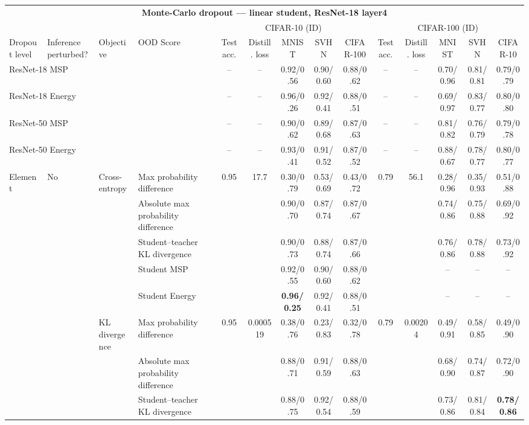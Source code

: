 \documentclass[border=2pt]{standalone}
\begin{document}
\scriptsize
\setlength{\tabcolsep}{4pt}
\begin{tabular}{llllcccccccccc}
\multicolumn{14}{c}{\textbf{Monte-Carlo dropout --- linear student, ResNet-18 layer4}}\\[4pt]
\multicolumn{4}{c}{} & \multicolumn{5}{c}{CIFAR-10 (ID)} & \multicolumn{5}{c}{CIFAR-100 (ID)} \\
\cmidrule(lr){5-9} \cmidrule(lr){10-14}
\toprule
Dropout level & Inference perturbed? & Objective & OOD Score & Test acc. & Distill. loss & MNIST & SVHN & CIFAR-100 & Test acc. & Distill. loss & MNIST & SVHN & CIFAR-10 \\
\midrule
\multicolumn{4}{l}{ResNet-18 MSP} & -- & -- & 0.92/0.56 & 0.90/0.60 & 0.88/0.62 & -- & -- & 0.70/0.96 & 0.81/0.81 & 0.79/0.79 \\
\multicolumn{4}{l}{ResNet-18 Energy} & -- & -- & 0.96/0.26 & 0.92/0.41 & 0.88/0.51 & -- & -- & 0.69/0.97 & 0.83/0.77 & 0.80/0.80 \\
\multicolumn{4}{l}{ResNet-50 MSP} & -- & -- & 0.90/0.62 & 0.89/0.68 & 0.87/0.63 & -- & -- & 0.81/0.82 & 0.76/0.79 & 0.79/0.78 \\
\multicolumn{4}{l}{ResNet-50 Energy} & -- & -- & 0.93/0.41 & 0.91/0.52 & 0.87/0.52 & -- & -- & 0.88/0.67 & 0.78/0.77 & 0.80/0.77 \\
\midrule
Element & No & Cross-entropy & Max probability difference & 0.95 & 17.7 & 0.30/0.79 & 0.53/0.69 & 0.43/0.72 & 0.79 & 56.1 & 0.28/0.96 & 0.35/0.93 & 0.51/0.88 \\
 &  &  & Absolute max probability difference &  &  & 0.90/0.70 & 0.87/0.74 & 0.87/0.67 &  &  & 0.74/0.86 & 0.75/0.88 & 0.69/0.92 \\
 &  &  & Student--teacher KL divergence &  &  & 0.90/0.73 & 0.88/0.74 & 0.87/0.66 &  &  & 0.76/0.86 & 0.78/0.88 & 0.73/0.92 \\
 &  &  & Student MSP &  &  & 0.92/0.55 & 0.90/0.60 & 0.88/0.62 &  &  & -- & -- & -- \\
 &  &  & Student Energy &  &  & \textbf{0.96/0.25} & 0.92/0.41 & 0.88/0.51 &  &  & -- & -- & -- \\
 &  & KL divergence & Max probability difference & 0.95 & 0.000519 & 0.38/0.76 & 0.23/0.83 & 0.32/0.78 & 0.79 & 0.00204 & 0.49/0.91 & 0.58/0.85 & 0.49/0.90 \\
 &  &  & Absolute max probability difference &  &  & 0.88/0.71 & 0.91/0.59 & 0.88/0.63 &  &  & 0.68/0.90 & 0.74/0.87 & 0.72/0.90 \\
 &  &  & Student--teacher KL divergence &  &  & 0.88/0.75 & 0.92/0.54 & 0.88/0.59 &  &  & 0.73/0.86 & 0.81/0.84 & \textbf{0.78/0.86} \\

\end{tabular}
\end{document}

